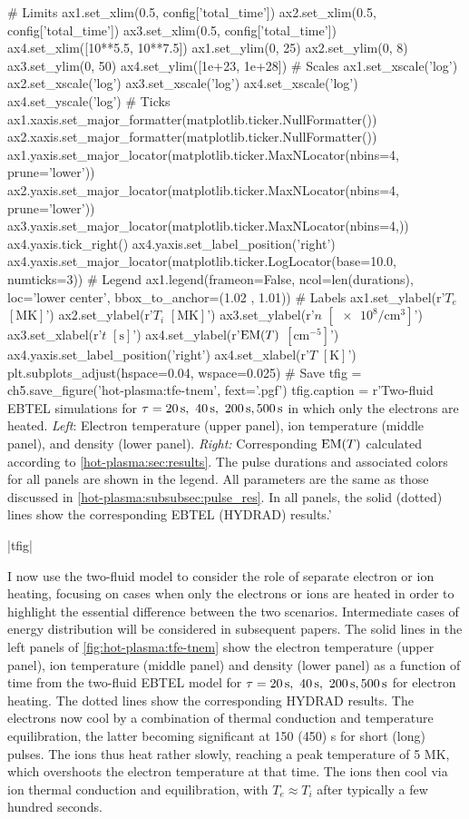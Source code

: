 \begin{pycode}[chapter5]
# Limits
ax1.set_xlim(0.5, config['total_time'])
ax2.set_xlim(0.5, config['total_time'])
ax3.set_xlim(0.5, config['total_time'])
ax4.set_xlim([10**5.5, 10**7.5])
ax1.set_ylim(0, 25)
ax2.set_ylim(0, 8)
ax3.set_ylim(0, 50)
ax4.set_ylim([1e+23, 1e+28])
# Scales
ax1.set_xscale('log')
ax2.set_xscale('log')
ax3.set_xscale('log')
ax4.set_xscale('log')
ax4.set_yscale('log')
# Ticks
ax1.xaxis.set_major_formatter(matplotlib.ticker.NullFormatter())
ax2.xaxis.set_major_formatter(matplotlib.ticker.NullFormatter())
ax1.yaxis.set_major_locator(matplotlib.ticker.MaxNLocator(nbins=4, prune='lower'))
ax2.yaxis.set_major_locator(matplotlib.ticker.MaxNLocator(nbins=4, prune='lower'))
ax3.yaxis.set_major_locator(matplotlib.ticker.MaxNLocator(nbins=4,))
ax4.yaxis.tick_right()
ax4.yaxis.set_label_position('right')
ax4.yaxis.set_major_locator(matplotlib.ticker.LogLocator(base=10.0, numticks=3))
# Legend
ax1.legend(frameon=False, ncol=len(durations), loc='lower center',
            bbox_to_anchor=(1.02 , 1.01))
# Labels
ax1.set_ylabel(r'$T_e$ $[\si{\mega\kelvin}]$')
ax2.set_ylabel(r'$T_i$ $[\si{\mega\kelvin}]$')
ax3.set_ylabel(r'$n$ $[\num{e8}\si{\per\cubic\cm}]$')
ax3.set_xlabel(r'$t$ $[\si{\second}]$')
ax4.set_ylabel(r'$\textup{EM}(T)$ $[\si{\cm\tothe{-5}}]$')
ax4.yaxis.set_label_position('right')
ax4.set_xlabel(r'$T$ $[\si{\kelvin}]$')
plt.subplots_adjust(hspace=0.04, wspace=0.025)
# Save
tfig = ch5.save_figure('hot-plasma:tfe-tnem', fext='.pgf')
tfig.caption = r'Two-fluid EBTEL simulations for $\tau=\SIlist[list-final-separator = {,}]{20;40;200;500}{\second}$ in which only the electrons are heated. \textit{Left}: Electron temperature (upper panel), ion temperature (middle panel), and density (lower panel). \textit{Right:} Corresponding $\emd[T]$ calculated according to \autoref{hot-plasma:sec:results}. The pulse durations and associated colors for all panels are shown in the legend. All parameters are the same as those discussed in \autoref{hot-plasma:subsubsec:pulse_res}. In all panels, the solid (dotted) lines show the corresponding EBTEL (HYDRAD) results.'
\end{pycode}
\py[chapter5]|tfig|

I now use the two-fluid model to consider the role of separate electron or ion heating, focusing on cases when only the electrons or ions are heated in order to highlight the essential difference between the two scenarios. Intermediate cases of energy distribution will be considered in subsequent papers. The solid lines in the left panels of \autoref{fig:hot-plasma:tfe-tnem} show the electron temperature (upper panel), ion temperature (middle panel) and density (lower panel) as a function of time from the two-fluid EBTEL model for $\tau=\SIlist[list-final-separator = {,}]{20;40;200;500}{\second}$ for electron heating. The dotted lines show the corresponding HYDRAD results. The electrons now cool by a combination of thermal conduction and temperature equilibration, the latter becoming significant at 150 (450) s for short (long) pulses. The ions thus heat rather slowly, reaching a peak temperature of 5 MK, which overshoots the electron temperature at that time. The ions then cool via ion thermal conduction and equilibration, with $T_e \approx T_i$ after typically a few hundred seconds.

